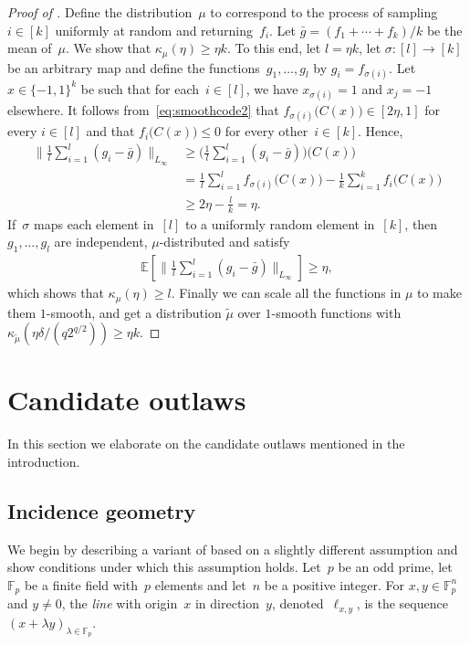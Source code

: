 \documentclass{toc}
\newcommand{\pmset}[1]{\{-1,1\}^{#1}} %
\newcommand{\Exp}{{\mathbb{E}}}
\newcommand{\F}{{\mathbb{F}}}
\begin{document}
\begin{proof}[Proof of ]
Define the distribution~$\mu$ to correspond to the process of sampling $i\in[k]$ uniformly at random and returning~$f_i$.
Let $\bar g = (f_1 + \cdots + f_k)/k$ be the mean of~$\mu$.
We show that $\kappa_\mu(\eta) \geq \eta k$.
To this end, let $l = \eta k$, let $\sigma:[l]\to[k]$ be an arbitrary map and define the functions~$g_1,\dots,g_l$ by $g_i = f_{\sigma(i)}$.
Let~$x\in\pmset{k}$ be such that for each~$i\in[l]$, we have $x_{\sigma(i)} = 1$ and $x_j = -1$ elsewhere.
It follows from~\eqref{eq:smoothcode2} that
$f_{\sigma(i)}\big(C(x)\big) \in [2\eta,1]$ for every $i\in[l]$ and that $f_{i}\big(C(x)\big) \leq 0$ for every other~$i\in[k]$.
Hence,
\begin{align*}
\Big\|
\frac{1}{l}\sum_{i=1}^l(g_i - \bar g)
\Big\|_{L_\infty}
&\geq
\Big(
\frac{1}{l}\sum_{i=1}^l(g_i - \bar g)
\Big)
\big(C(x)\big)\\
&=
\frac{1}{l}\sum_{i=1}^lf_{\sigma(i)}\big(C(x)\big)
-
\frac{1}{k}\sum_{i=1}^kf_{i}\big(C(x)\big)\\
&\geq
2\eta - \frac{l}{k}= \eta.
\end{align*}
If~$\sigma$ maps each element in~$[l]$ to a uniformly random element in~$[k]$, then $g_1,\dots,g_l$ are independent, $\mu$-distributed and satisfy
\begin{align*}
\Exp\left[
\Big\|
\frac{1}{l}\sum_{i=1}^l(g_i - \bar g)
\Big\|_{L_\infty}
\right]
\geq
\eta,
\end{align*}
which shows that $\kappa_\mu(\eta) \geq l$. Finally we can scale all the functions in $\mu$ to make them $1$-smooth, and get a distribution $\tilde{\mu}$ over $1$-smooth functions with $\kappa_{\tilde{\mu}}(\eta \delta/(q2^{q/2}))\ge \eta k$.
\end{proof}





\section{Candidate outlaws}
\label{sec:candidates}
In this section we elaborate on the candidate outlaws mentioned in the introduction.

\subsection{Incidence geometry}
\label{sec:lines}

We begin by describing a variant of  based on a slightly different assumption and show conditions under which this assumption holds.
Let~$p$ be an odd prime, let~$\F_p$ be a finite field with~$p$ elements and let~$n$ be a positive integer.
%
For $x,y\in \F_p^n$ and $y\ne 0$, the \emph{line} with origin~$x$ in direction~$y$, denoted~$\ell_{x,y}$, is the sequence $(x + \lambda y)_{\lambda \in \F_p}$.
%
\end{document}
